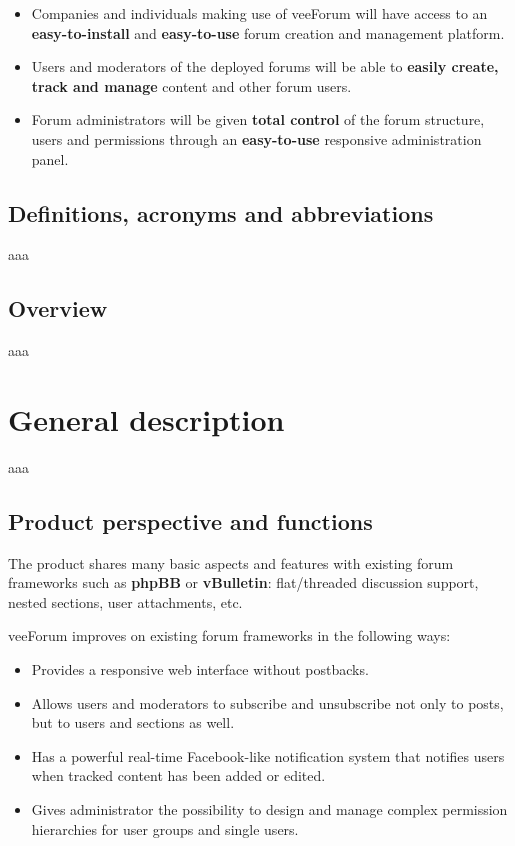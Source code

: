 \documentclass[12pt]{report}
\renewcommand\emph{\textbf}
\begin{document}
                        \begin{itemize}
                            \item Companies and individuals making use of veeForum will have access to an \emph{easy-to-install} and \emph{easy-to-use} forum creation and management platform.
                            \item Users and moderators of the deployed forums will be able to \emph{easily create, track and manage} content and other forum users.
                            \item Forum administrators will be given \emph{total control} of the forum structure, users and permissions through an \emph{easy-to-use} responsive administration panel.
                        \end{itemize}

                \subsection{Definitions, acronyms and abbreviations}
                    aaa

                \subsection{Overview}
                    aaa

            \section{General description}
                aaa

                \subsection{Product perspective and functions}
                    The product shares many basic aspects and features with existing forum frameworks such as \emph{phpBB} or \emph{vBulletin}: flat/threaded discussion support, nested sections, user attachments, etc.

                    veeForum improves on existing forum frameworks in the following ways:

                    \begin{itemize}
                        \item Provides a responsive web interface without postbacks.
                        \item Allows users and moderators to subscribe and unsubscribe not only to posts, but to users and sections as well.
                        \item Has a powerful real-time Facebook-like notification system that notifies users when tracked content has been added or edited.
                        \item Gives administrator the possibility to design and manage complex permission hierarchies for user groups and single users.
                    \end{itemize}
\end{document}
